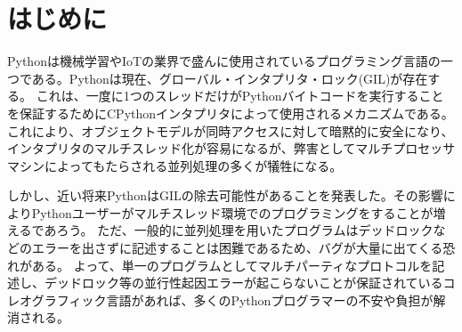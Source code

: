 \documentclass{thesis}
\begin{document}
\maketitle %
\frontmatter\tableofcontents\mainmatter %

\chapter{はじめに}
Pythonは機械学習やIoTの業界で盛んに使用されているプログラミング言語の一つである。Pythonは現在、グローバル・インタプリタ・ロック(GIL)が存在する。
これは、一度に1つのスレッドだけがPythonバイトコードを実行することを保証するためにCPythonインタプリタによって使用されるメカニズムである。
これにより、オブジェクトモデルが同時アクセスに対して暗黙的に安全になり、インタプリタのマルチスレッド化が容易になるが、弊害としてマルチプロセッサマシンによってもたらされる並列処理の多くが犠牲になる。

しかし、近い将来PythonはGILの除去可能性があることを発表した。その影響によりPythonユーザーがマルチスレッド環境でのプログラミングをすることが増えるであろう。
ただ、一般的に並列処理を用いたプログラムはデッドロックなどのエラーを出さずに記述することは困難であるため、バグが大量に出てくる恐れがある。
よって、単一のプログラムとしてマルチパーティなプロトコルを記述し、デッドロック等の並行性起因エラーが起こらないことが保証されているコレオグラフィック言語があれば、多くのPythonプログラマーの不安や負担が解消される。
\end{document}
